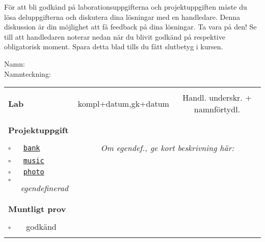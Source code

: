 \vspace{1em}\noindent
För att bli godkänd på laborationsuppgifterna och projektuppgiften måste du lösa deluppgifterna och diskutera dina lösningar med en handledare. Denna diskussion är din möjlighet att få feedback på dina lösningar. Ta vara på den!
Se till att handledaren noterar nedan när du blivit godkänd på respektive obligatorisk moment. Spara detta blad tills du fått slutbetyg i kursen.


\vspace{2.2em}\noindent Namn: \dotfill\\

\vspace{1em}\noindent Namnteckning: \dotfill\\

\newcommand{\LabRow}[1]{\\[-1.1em] \hyperref[section:lab:#1]{\texttt{#1}} & \dotfill &  \dotfill  \\[0.7em]}  %

\begin{table}[h]
\vspace{1em}
\begin{tabular}{lcc}
\hline%
\\
{\sffamily\bfseries\small Lab} & {\sffamily\small kompl+datum,gk+datum } &	
{\sffamily\small Handl. underskr. + namnförtydl.}\\ %
\\[-0.5em]

\\ 
{\sffamily\small {\bfseries Projektuppgift}} & \dotfill &  \dotfill  \\
\\
{\Large$\square$}\texttt{~~~\hyperref[section:proj:bank]{bank}} &
\multicolumn{2}{c}{\textit{Om egendef., ge kort beskrivning här:}}  \\[0.6em] %
{\Large$\square$}\texttt{~~~\hyperref[section:proj:music]{music}} \\[0.6em] %
{\Large$\square$}\texttt{~~~\hyperref[section:proj:photo]{photo}}  \\[0.6em] %
{\Large$\square$}\texttt{~~~}\textit{egendefinerad}  \\
\\
\\
{\sffamily\small {\bfseries Muntligt prov}} &  & \\
\\
{\Large$\square$}\texttt{~~~} godkänd & \dotfill &  \dotfill \\
\\\hline%
\end{tabular}
\end{table}
